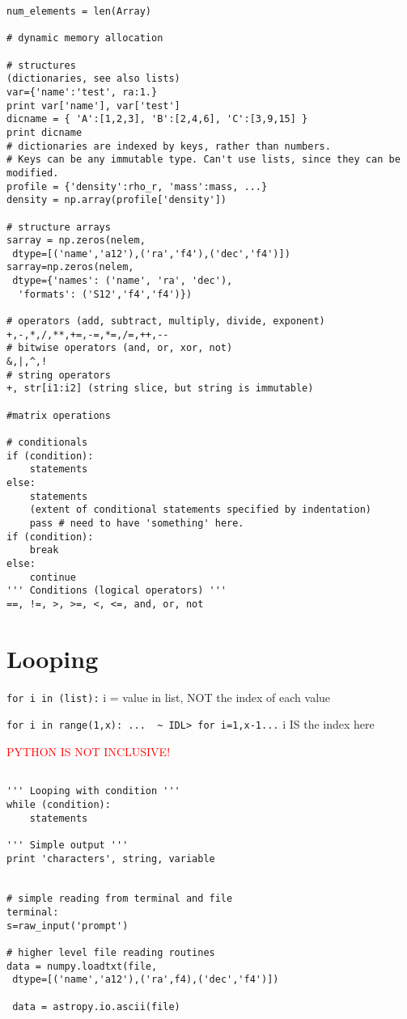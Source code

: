 \documentclass{article}
\begin{document}
\begin{verbatim}
num_elements = len(Array)

# dynamic memory allocation

# structures
(dictionaries, see also lists)
var={'name':'test', ra:1.}
print var['name'], var['test']
dicname = { 'A':[1,2,3], 'B':[2,4,6], 'C':[3,9,15] }
print dicname
# dictionaries are indexed by keys, rather than numbers.
# Keys can be any immutable type. Can't use lists, since they can be modified.
profile = {'density':rho_r, 'mass':mass, ...}
density = np.array(profile['density'])

# structure arrays
sarray = np.zeros(nelem,
 dtype=[('name','a12'),('ra','f4'),('dec','f4')])
sarray=np.zeros(nelem,
 dtype={'names': ('name', 'ra', 'dec'),
  'formats': ('S12','f4','f4')})

# operators (add, subtract, multiply, divide, exponent)
+,-,*,/,**,+=,-=,*=,/=,++,--
# bitwise operators (and, or, xor, not)
&,|,^,!
# string operators
+, str[i1:i2] (string slice, but string is immutable)

#matrix operations

# conditionals
if (condition):
    statements
else:
    statements
    (extent of conditional statements specified by indentation)
    pass # need to have 'something' here.
if (condition):
    break
else:
    continue
''' Conditions (logical operators) '''
==, !=, >, >=, <, <=, and, or, not
\end{verbatim}

\section*{Looping}
\verb|for i in (list):| i = value in list, NOT the index of each value

\verb|for i in range(1,x): ...  ~ IDL> for i=1,x-1...| i IS the index here

\textcolor{red}{PYTHON IS NOT INCLUSIVE!}

\begin{verbatim}

''' Looping with condition '''
while (condition):
    statements

''' Simple output '''
print 'characters', string, variable


# simple reading from terminal and file
terminal:
s=raw_input('prompt')

# higher level file reading routines
data = numpy.loadtxt(file,
 dtype=[('name','a12'),('ra',f4),('dec','f4')])

 data = astropy.io.ascii(file)

\end{verbatim}
\end{document}
